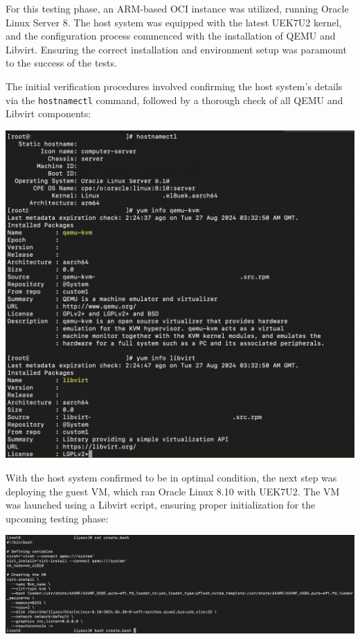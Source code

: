 For this testing phase, an ARM-based OCI instance was utilized, running Oracle Linux Server 8. The host system was equipped with the latest UEK7U2 kernel, and the configuration process commenced with the installation of QEMU and Libvirt. Ensuring the correct installation and environment setup was paramount to the success of the tests.\mynewline

The initial verification procedures involved confirming the host system's details via the \texttt{hostnamectl} command, followed by a thorough check of all QEMU and Libvirt components:

\begin{center}
    \centering
    \includegraphics[width=\textwidth]{Images/Host System Config 3.png}
    \label{fig:casa}
\end{center}

With the host system confirmed to be in optimal condition, the next step was deploying the guest VM, which ran Oracle Linux 8.10 with UEK7U2. The VM was launched using a Libvirt script, ensuring proper initialization for the upcoming testing phase:

\begin{center}
    \centering
    \includegraphics[width=\textwidth]{Images/Launching Guest 3.png}
    \label{fig:casa}
\end{center}

